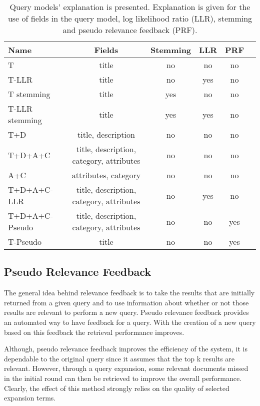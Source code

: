 \begin{table}[H]
\begin{center}
\scriptsize
\caption{Query models' explanation is presented. Explanation is given for the use of fields in the query model, log likelihood ratio (LLR), stemming and pseudo relevance feedback (PRF).}
\label{table:QueryFields}
\begin{tabular}{lccccr}
\midrule
Name & Fields & Stemming & LLR & PRF \\
\midrule
T & title & no & no & no \\
T-LLR & title & no & yes & no \\
T stemming & title & yes & no & no \\
T-LLR stemming & title & yes & yes & no \\
T+D  & title, description & no & no & no \\
T+D+A+C & title, description, category, attributes & no & no & no \\
A+C & attributes, category & no & no & no \\
T+D+A+C-LLR & title, description, category, attributes & no & yes & no \\
T+D+A+C-Pseudo & title, description, category, attributes & no & no & yes \\
T-Pseudo & title & no & no & yes\\
\bottomrule
\end{tabular}
\end{center}
\end{table}

\subsection{Pseudo Relevance Feedback}

The general idea behind relevance feedback is to take the results that are initially returned from a given query and to use information about whether or not those results are relevant to perform a new query. Pseudo relevance feedback provides an automated way to have feedback for a query. With the creation of a new query based on this feedback the retrieval performance improves.

Although, pseudo relevance feedback improves the efficiency of the system, it is dependable to the original query since it assumes that the top k results are relevant. However, through a query expansion, some relevant documents missed in the initial round can then be retrieved to improve the overall performance. Clearly, the effect of this method strongly relies on the quality of selected expansion terms.

